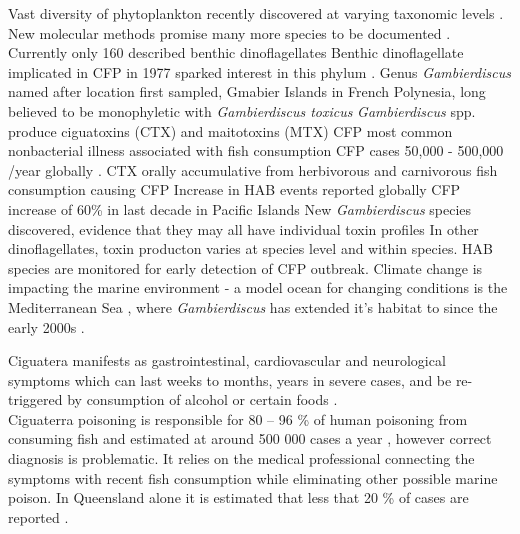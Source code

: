 \documentclass[12pt]{article}
\begin{document}
Vast diversity of phytoplankton recently discovered at varying taxonomic levels \cite{simon2009diversity}. 
New molecular methods promise many more species to be documented \cite{murray2012genetic,murray2012transcriptomics}.
Currently only 160 described benthic dinoflagellates \cite{taylor2008dinoflagellate} %
Benthic dinoflagellate implicated in CFP in 1977 sparked interest in this phylum \cite{yasumoto1977finding}.
Genus \emph{Gambierdiscus} named after location first sampled, Gmabier Islands in French Polynesia, long believed to be monophyletic with \emph{Gambierdiscus toxicus} \cite{adachi1979thecal} %
\emph{Gambierdiscus} spp. produce ciguatoxins (CTX) and maitotoxins (MTX) \cite{chinain1997intraspecific,chinain1999morphology,chinain1999seasonal,chinain2010growth,holmes1998gambierdiscus,rhodes2010toxic,fraga2011gambierdiscus,holland2013differences}
CFP most common nonbacterial illness associated with fish consumption \cite{friedman2008ciguatera} %
CFP cases 50,000 - 500,000 /year globally \cite{fleming1998seafood}.
CTX orally accumulative from herbivorous and carnivorous fish consumption causing CFP \cite{bagnis1979clinical,gillespie1987possible,sims1987theoretical} %
Increase in HAB events reported globally \cite{hallegraeff2010ocean} %
CFP increase of 60\% in last decade in Pacific Islands \cite{skinner2011ciguatera}
New \emph{Gambierdiscus} species discovered, evidence that they may all have individual toxin profiles \cite{chinain2010growth,fraga2011gambierdiscus,holland2013differences}
In other dinoflagellates, toxin producton varies at species level and within species.
HAB species are monitored for early detection of CFP outbreak.
Climate change is impacting the marine environment - a model ocean for changing conditions is the Mediterranean Sea \cite{lejeusne2010climate}, where \emph{Gambierdiscus} has extended it's habitat to since the early 2000s \cite{aligizaki2008morphological}.

Ciguatera manifests as gastrointestinal, cardiovascular and neurological symptoms which can last weeks to months, years in severe cases, and be re-triggered by consumption of alcohol or certain foods \cite{lewis2006ciguatera}. 
\\

Ciguaterra poisoning is responsible for 80 – 96 \% of human poisoning from consuming fish and estimated at around 500 000 cases a year \cite{grandjean2008centers}, however correct diagnosis is problematic. It relies on the medical professional connecting the symptoms with recent fish consumption while eliminating other possible marine poison. In Queensland alone it is estimated that less that 20 \% of cases are reported \cite{lewis2006ciguatera}.\\
\end{document}
